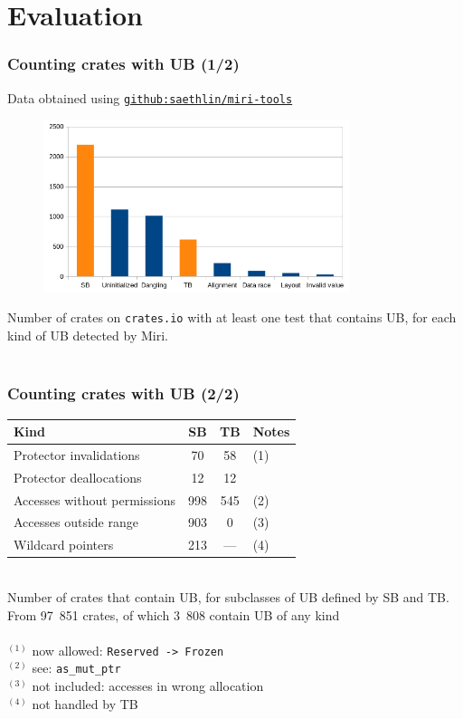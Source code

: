 \section{Evaluation}

\begin{frame}
    \frametitle{Counting crates with UB (1/2)}
    {\footnotesize
    Data obtained using \href{https://github.com/saethlin/miri-tools}{\texttt{github:saethlin/miri-tools}}\\
    }
    \begin{figure}
        \includegraphics[width=0.8\textwidth]{../img/ub-count.png}
    \end{figure}
    {\footnotesize Number of crates on \texttt{crates.io} with at least one test
    that contains UB, for each kind of UB detected by Miri.}\\~\\
\end{frame}

\begin{frame}
    \frametitle{Counting crates with UB (2/2)}
    \begin{tabular}{|l|c|c|l|}
        \hline
        Kind                         &  SB &  TB & Notes\\
        \hline
        Protector invalidations      &  70 &  58 & \tiny(1) \\
        Protector deallocations      &  12 &  12 & \\
        Accesses without permissions & 998 & 545 & \tiny(2) \\
        Accesses outside range       & 903 &   0 & \tiny(3) \\
        Wildcard pointers            & 213 & --- & \tiny(4) \\
        \hline
    \end{tabular}\\
    Number of crates that contain UB, for subclasses of UB defined by SB and TB.
    From 97~851 crates, of which 3~808 contain UB of any kind~\\~\\

    {\footnotesize
    \(^{(1)}\) now allowed: \texttt{Reserved -> Frozen}\\
    \(^{(2)}\) see: \texttt{as\_mut\_ptr}\\
    \(^{(3)}\) not included: accesses in wrong allocation\\
    \(^{(4)}\) not handled by TB\\
    }
\end{frame}

